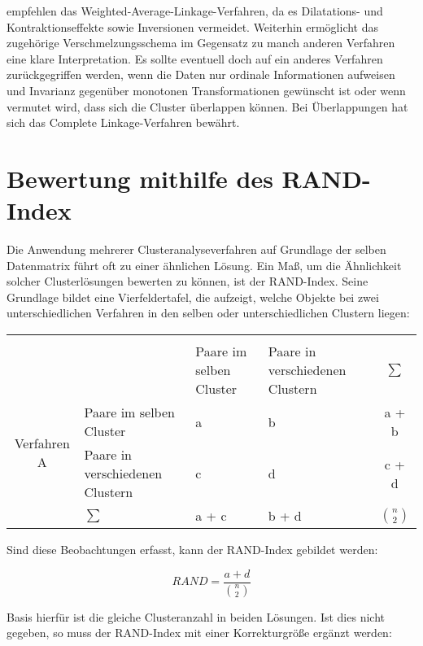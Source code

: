 \citet[S. 275]{Bacher.2010} empfehlen das Weighted-Average-Linkage-Verfahren, da es Dilatations- und Kontraktionseffekte sowie Inversionen vermeidet. Weiterhin ermöglicht das zugehörige Verschmelzungsschema im Gegensatz zu manch anderen Verfahren eine klare Interpretation. Es sollte eventuell doch auf ein anderes Verfahren zurückgegriffen werden, wenn die Daten nur ordinale Informationen aufweisen und Invarianz gegenüber monotonen Transformationen gewünscht ist oder wenn vermutet wird, dass sich die Cluster überlappen können. Bei Überlappungen hat sich das Complete Linkage-Verfahren bewährt.

\section{Bewertung mithilfe des RAND-Index}

\citet[S. 270]{Everitt.2011} Die Anwendung mehrerer Clusteranalyseverfahren auf Grundlage der selben Datenmatrix führt oft zu einer ähnlichen Lösung. Ein Maß, um die Ähnlichkeit solcher Clusterlösungen bewerten zu können, ist der RAND-Index. Seine Grundlage bildet eine Vierfeldertafel, die aufzeigt, welche Objekte bei zwei unterschiedlichen Verfahren in den selben oder unterschiedlichen Clustern liegen:

\begin{tabular}{c>{\raggedright\arraybackslash}p{4cm}|>{\centering\arraybackslash}p{4cm}>{\centering\arraybackslash}p{4cm}|c}
	& & \multicolumn{2}{c|}{Verfahren B} & \\ 
	& & Paare im selben Cluster & Paare in verschiedenen Clustern & $\sum$ \\ \hline
	\multirow{2}{*}{Verfahren A} & Paare im selben Cluster & a & b & a + b \\
	& Paare in verschiedenen Clustern & c & d & c + d \\ \hline
	& $\sum$ & a + c & b + d & $\binom{n}{2}$ \\ 
\end{tabular}
\bigskip

Sind diese Beobachtungen erfasst, kann der RAND-Index gebildet werden:

\begin{equation}
RAND = \frac{a+d}{\binom{n}{2}}
\end{equation}

Basis hierfür ist die gleiche Clusteranzahl in beiden Lösungen. Ist dies nicht gegeben, so muss der RAND-Index mit einer Korrekturgröße ergänzt werden:

